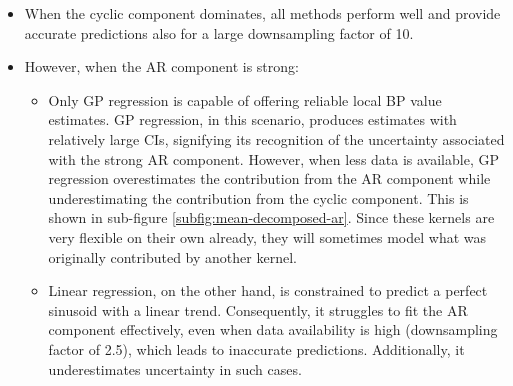 \begin{itemize}
    \item When the cyclic component dominates, all methods perform well and
    provide accurate predictions also for a large downsampling factor of 10.
    \item However, when the AR component is strong:
    \begin{itemize}
        \item Only GP regression is capable of offering reliable local BP value estimates.
    GP regression, in this scenario, produces estimates with relatively
    large CIs, signifying its recognition of the uncertainty associated with the strong AR component.
    However, when less data is available, GP regression overestimates the contribution from the AR component
    while underestimating the contribution
    from the cyclic component.
    This is shown in sub-figure \ref{subfig:mean-decomposed-ar}.
    Since these kernels are very flexible on their own already, they will sometimes
    model what was originally contributed by another kernel.
    \item Linear regression, on the other hand, is constrained
    to predict a perfect sinusoid with a linear trend.
    Consequently, it struggles to fit the AR component effectively,
    even when data availability is high (downsampling factor of 2.5), which leads to inaccurate predictions.
    Additionally, it underestimates uncertainty in such cases.
    \end{itemize}

\end{itemize}


